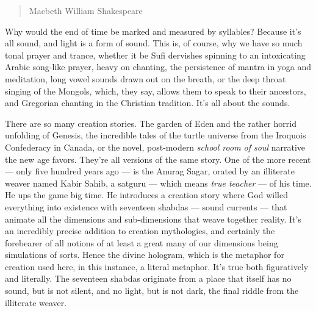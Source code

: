 \begin{quote}
Macbeth William Shakespeare
\end{quote}

Why would the end of time be marked and measured by syllables? Because
it's all sound, and light is a form of sound. This is, of course, why we
have so much tonal prayer and trance, whether it be Sufi dervishes
spinning to an intoxicating Arabic song-like prayer, heavy on chanting,
the persistence of mantra in yoga and meditation, long vowel sounds
drawn out on the breath, or the deep throat singing of the Mongols,
which, they say, allows them to speak to their ancestors, and Gregorian
chanting in the Christian tradition. It's all about the sounds.

There are so many creation stories. The garden of Eden and the rather
horrid unfolding of Genesis, the incredible tales of the turtle universe
from the Iroquois Confederacy in Canada, or the novel, post-modern
\emph{school room of soul} narrative the new age favors. They're all
versions of the same story. One of the more recent --- only five hundred
years ago --- is the Anurag Sagar, orated by an illiterate weaver named
Kabir Sahib, a satguru --- which means \emph{true teacher} --- of his
time. He ups the game big time. He introduces a creation story where God
willed everything into existence with seventeen shabdas --- sound
currents --- that animate all the dimensions and sub-dimensions that
weave together reality. It's an incredibly precise addition to creation
mythologies, and certainly the forebearer of all notions of at least a
great many of our dimensions being simulations of sorts. Hence the
divine hologram, which is the metaphor for creation used here, in this
instance, a literal metaphor. It's true both figuratively and literally.
The seventeen shabdas originate from a place that itself has no sound,
but is not silent, and no light, but is not dark, the final riddle from
the illiterate weaver.

